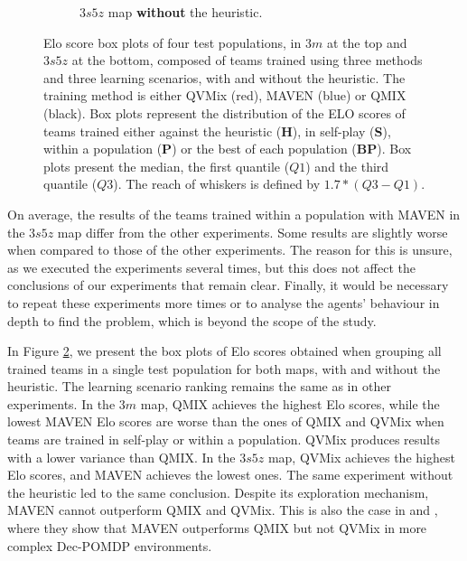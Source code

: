 \begin{figure}[ht]
\begin{subfigure}{\textwidth}
\caption{$3s5z$ map \textbf{without} the heuristic.}
\label{subfig:3s5z_all_no_h}
\end{subfigure}
\caption{
Elo score box plots of four test populations, in $3m$ at the top and $3s5z$ at the bottom, composed of teams trained using three methods and three learning scenarios, with and without the heuristic.
The training method is either QVMix (red), MAVEN (blue) or QMIX (black).
Box plots represent the distribution of the ELO scores of teams trained either against the heuristic (\textbf{H}), in self-play (\textbf{S}), within a population (\textbf{P}) or the best of each population (\textbf{BP}).
Box plots present the median, the first quantile ($Q1$) and the third quantile ($Q3$). The reach of whiskers is defined by $1.7*(Q3-Q1)$.
}
\label{fig:all}
\end{figure}

On average, the results of the teams trained within a population with MAVEN in the $3s5z$ map differ from the other experiments. 
Some results are slightly worse when compared to those of the other experiments.
The reason for this is unsure, as we executed the experiments several times, but this does not affect the conclusions of our experiments that remain clear.
Finally, it would be necessary to repeat these experiments more times or to analyse the agents' behaviour in depth to find the problem, which is beyond the scope of the study. 

In Figure \ref{fig:all}, we present the box plots of Elo scores obtained when grouping all trained teams in a single test population for both maps, with and without the heuristic.
The learning scenario ranking remains the same as in other experiments.
In the $3m$ map, QMIX achieves the highest Elo scores, while the lowest MAVEN Elo scores are worse than the ones of QMIX and QVMix when teams are trained in self-play or within a population.
QVMix produces results with a lower variance than QMIX.
In the $3s5z$ map, QVMix achieves the highest Elo scores, and MAVEN achieves the lowest ones.
The same experiment without the heuristic led to the same conclusion.
Despite its exploration mechanism, MAVEN cannot outperform QMIX and QVMix.
This is also the case in \citep{Mahajan2019MAVEN:Exploration} and \citep{leroy2020qvmix}, where they show that MAVEN outperforms QMIX but not QVMix in more complex Dec-POMDP environments.


